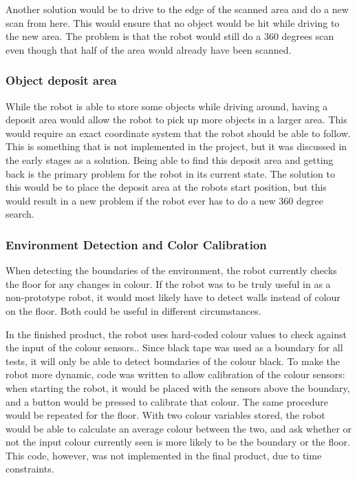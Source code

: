 Another solution would be to drive to the edge of the scanned area and do a new scan from here. This would ensure that no object would be hit while driving to the new area. The problem is that the robot would still do a 360 degrees scan even though that half of the area would already have been scanned.

\subsubsection{Object deposit area}
While the robot is able to store some objects while driving around, having a deposit area would allow the robot to pick up more objects in a larger area. This would require an exact coordinate system that the robot should be able to follow. This is something that is not implemented in the project, but it was discussed in the early stages as a solution. Being able to find this deposit area and getting back is the primary problem for the robot in its current state. The solution to this would be to place the deposit area at the robots start position, but this would result in a new problem if the robot ever has to do a new 360 degree search. 

\subsubsection{Environment Detection and Color Calibration}
When detecting the boundaries of the environment, the robot currently checks the floor for any changes in colour. If the robot was to be truly useful in as a non-prototype robot, it would most likely have to detect walls instead of colour on the floor. Both could be useful in different circumstances.

In the finished product, the robot uses hard-coded colour values to check against the input of the colour sensors.. Since black tape was used as a boundary for all tests, it will only be able to detect boundaries of the colour black. To make the robot more dynamic, code was written to allow calibration of the colour sensors: when starting the robot, it would be placed with the sensors above the boundary, and a button would be pressed to calibrate that colour. The same procedure would be repeated for the floor. With two colour variables stored, the robot would be able to calculate an average colour between the two, and ask whether or not the input colour currently seen is more likely to be the boundary or the floor. This code, however, was not implemented in the final product, due to time constraints.